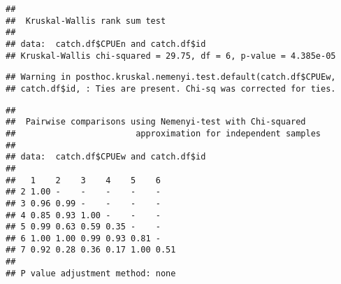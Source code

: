 \documentclass[]{article}
\newenvironment{Shaded}{\begin{snugshade}}{\end{snugshade}}
\newcommand{\KeywordTok}[1]{\textcolor[rgb]{0.13,0.29,0.53}{\textbf{#1}}}
\newcommand{\DataTypeTok}[1]{\textcolor[rgb]{0.13,0.29,0.53}{#1}}
\newcommand{\StringTok}[1]{\textcolor[rgb]{0.31,0.60,0.02}{#1}}
\newcommand{\CommentTok}[1]{\textcolor[rgb]{0.56,0.35,0.01}{\textit{#1}}}
\newcommand{\OperatorTok}[1]{\textcolor[rgb]{0.81,0.36,0.00}{\textbf{#1}}}
\newcommand{\NormalTok}[1]{#1}
\begin{document}
\begin{Shaded}
\end{Shaded}

\begin{verbatim}
## 
##  Kruskal-Wallis rank sum test
## 
## data:  catch.df$CPUEn and catch.df$id
## Kruskal-Wallis chi-squared = 29.75, df = 6, p-value = 4.385e-05
\end{verbatim}

\begin{Shaded}
\end{Shaded}

\begin{verbatim}
## Warning in posthoc.kruskal.nemenyi.test.default(catch.df$CPUEw,
## catch.df$id, : Ties are present. Chi-sq was corrected for ties.
\end{verbatim}

\begin{verbatim}
## 
##  Pairwise comparisons using Nemenyi-test with Chi-squared    
##                        approximation for independent samples 
## 
## data:  catch.df$CPUEw and catch.df$id 
## 
##   1    2    3    4    5    6   
## 2 1.00 -    -    -    -    -   
## 3 0.96 0.99 -    -    -    -   
## 4 0.85 0.93 1.00 -    -    -   
## 5 0.99 0.63 0.59 0.35 -    -   
## 6 1.00 1.00 0.99 0.93 0.81 -   
## 7 0.92 0.28 0.36 0.17 1.00 0.51
## 
## P value adjustment method: none
\end{verbatim}

\begin{Shaded}
\end{Shaded}
\end{document}
